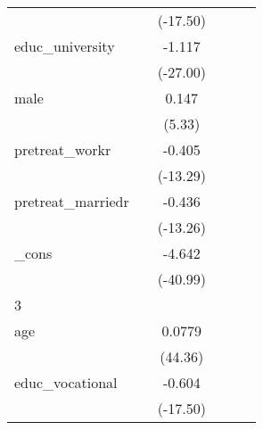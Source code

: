 {\begin{tabular}{l*{5}{c}}
            &                     &    (-17.50)         &                     &                     &                     \\
[1em]
educ\_university&                     &      -1.117\sym{***}&                     &                     &                     \\
            &                     &    (-27.00)         &                     &                     &                     \\
[1em]
male        &                     &       0.147\sym{***}&                     &                     &                     \\
            &                     &      (5.33)         &                     &                     &                     \\
[1em]
pretreat\_workr&                     &      -0.405\sym{***}&                     &                     &                     \\
            &                     &    (-13.29)         &                     &                     &                     \\
[1em]
pretreat\_marriedr&                     &      -0.436\sym{***}&                     &                     &                     \\
            &                     &    (-13.26)         &                     &                     &                     \\
[1em]
\_cons      &                     &      -4.642\sym{***}&                     &                     &                     \\
            &                     &    (-40.99)         &                     &                     &                     \\
\hline
3           &                     &                     &                     &                     &                     \\
age         &                     &      0.0779\sym{***}&                     &                     &                     \\
            &                     &     (44.36)         &                     &                     &                     \\
[1em]
educ\_vocational&                     &      -0.604\sym{***}&                     &                     &                     \\
            &                     &    (-17.50)         &                     &                     &                     \\

\end{tabular}}
